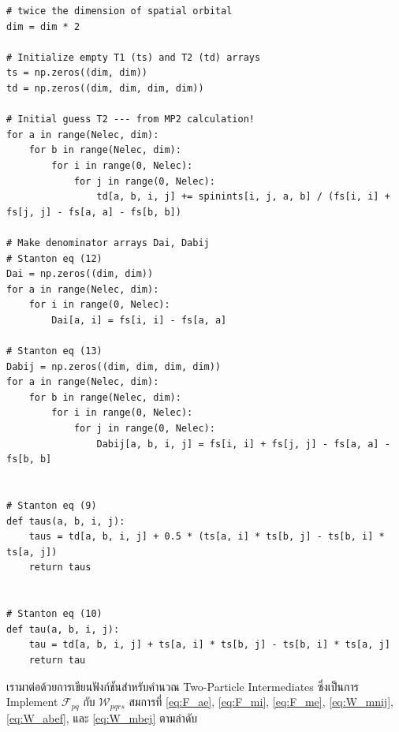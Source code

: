 \begin{lstlisting}[style=MyPython]
# twice the dimension of spatial orbital
dim = dim * 2

# Initialize empty T1 (ts) and T2 (td) arrays
ts = np.zeros((dim, dim))
td = np.zeros((dim, dim, dim, dim))

# Initial guess T2 --- from MP2 calculation!
for a in range(Nelec, dim):
    for b in range(Nelec, dim):
        for i in range(0, Nelec):
            for j in range(0, Nelec):
                td[a, b, i, j] += spinints[i, j, a, b] / (fs[i, i] + fs[j, j] - fs[a, a] - fs[b, b])

# Make denominator arrays Dai, Dabij
# Stanton eq (12)
Dai = np.zeros((dim, dim))
for a in range(Nelec, dim):
    for i in range(0, Nelec):
        Dai[a, i] = fs[i, i] - fs[a, a]

# Stanton eq (13)
Dabij = np.zeros((dim, dim, dim, dim))
for a in range(Nelec, dim):
    for b in range(Nelec, dim):
        for i in range(0, Nelec):
            for j in range(0, Nelec):
                Dabij[a, b, i, j] = fs[i, i] + fs[j, j] - fs[a, a] - fs[b, b]


# Stanton eq (9)
def taus(a, b, i, j):
    taus = td[a, b, i, j] + 0.5 * (ts[a, i] * ts[b, j] - ts[b, i] * ts[a, j])
    return taus


# Stanton eq (10)
def tau(a, b, i, j):
    tau = td[a, b, i, j] + ts[a, i] * ts[b, j] - ts[b, i] * ts[a, j]
    return tau
\end{lstlisting}

\noindent เรามาต่อด้วยการเขียนฟังก์ชันสำหรับคำนวณ Two-Particle Intermediates ซึ่งเป็นการ Implement $\mathscr{F}_{p q}$
กับ $\mathscr{W}_{p q r s}$ สมการที่ \eqref{eq:F_ae}, \eqref{eq:F_mi}, \eqref{eq:F_me}, \eqref{eq:W_mnij},
\eqref{eq:W_abef}, และ \eqref{eq:W_mbej} ตามลำดับ

\vspace{5pt}

